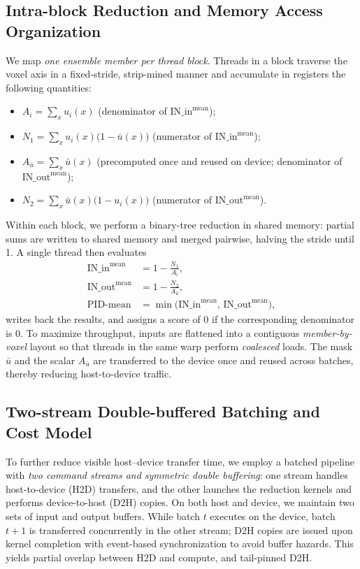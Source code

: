 \documentclass[review,journal]{vgtc}              %
\begin{document}
\subsection{Intra-block Reduction and Memory Access Organization}
We map \emph{one ensemble member per thread block}. Threads in a block traverse the voxel axis in a fixed-stride, strip-mined manner and accumulate in registers the following quantities:
\begin{itemize}
  \item \(\displaystyle A_i = \sum_x u_i(x)\) (denominator of \(\mathrm{IN\_in}^{\text{mean}}\));
  \item \(\displaystyle N_1 = \sum_x u_i(x)\bigl(1-\bar u(x)\bigr)\) (numerator of \(\mathrm{IN\_in}^{\text{mean}}\));
  \item \(\displaystyle A_{\bar u} = \sum_x \bar u(x)\) (precomputed once and reused on device; denominator of \(\mathrm{IN\_out}^{\text{mean}}\));
  \item \(\displaystyle N_2 = \sum_x \bar u(x)\bigl(1-u_i(x)\bigr)\) (numerator of \(\mathrm{IN\_out}^{\text{mean}}\)).
\end{itemize}
Within each block, we perform a binary-tree reduction in shared memory: partial sums are written to shared memory and merged pairwise, halving the stride until 1. A single thread then evaluates
\begin{align}
 \mathrm{IN\_in}^{\text{mean}} &= 1-\frac{N_1}{A_i}, \\
 \mathrm{IN\_out}^{\text{mean}} &= 1-\frac{N_2}{A_{\bar u}}, \\
 \mathrm{PID\text{-}mean} &= \min\bigl(\mathrm{IN\_in}^{\text{mean}},\, \mathrm{IN\_out}^{\text{mean}}\bigr),
\end{align}
writes back the results, and assigns a score of 0 if the corresponding denominator is 0. To maximize throughput, inputs are flattened into a contiguous \emph{member-by-voxel} layout so that threads in the same warp perform \emph{coalesced} loads. The mask \(\bar u\) and the scalar \(A_{\bar u}\) are transferred to the device once and reused across batches, thereby reducing host-to-device traffic.

\subsection{Two-stream Double-buffered Batching and Cost Model}
To further reduce visible host–device transfer time, we employ a batched pipeline with \emph{two command streams and symmetric double buffering}: one stream handles host-to-device (H2D) transfers, and the other launches the reduction kernels and performs device-to-host (D2H) copies. On both host and device, we maintain two sets of input and output buffers. While batch \(t\) executes on the device, batch \(t\!+\!1\) is transferred concurrently in the other stream; D2H copies are issued upon kernel completion with event-based synchronization to avoid buffer hazards. This yields partial overlap between H2D and compute, and tail-pinned D2H.
\end{document}
